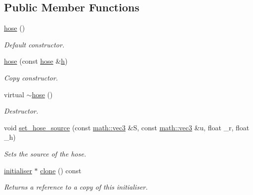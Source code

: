 \subsection*{Public Member Functions}
\begin{DoxyCompactItemize}
\item 
\mbox{\label{classphysim_1_1init_1_1hose_a1e74833ddbc964c7035a701c81f293f8}} 
\hyperlink{classphysim_1_1init_1_1hose_a1e74833ddbc964c7035a701c81f293f8}{hose} ()
\begin{DoxyCompactList}\small\item\em Default constructor. \end{DoxyCompactList}\item 
\hyperlink{classphysim_1_1init_1_1hose_ad29bc42187059e5d7e16f0e49819f138}{hose} (const \hyperlink{classphysim_1_1init_1_1hose}{hose} \&\hyperlink{classphysim_1_1init_1_1hose_a31d489427eb8f8db1b702cca637f8551}{h})
\begin{DoxyCompactList}\small\item\em Copy constructor. \end{DoxyCompactList}\item 
\mbox{\label{classphysim_1_1init_1_1hose_ad623ab25786c9aff8fe57839d81381bd}} 
virtual \hyperlink{classphysim_1_1init_1_1hose_ad623ab25786c9aff8fe57839d81381bd}{$\sim$hose} ()
\begin{DoxyCompactList}\small\item\em Destructor. \end{DoxyCompactList}\item 
void \hyperlink{classphysim_1_1init_1_1hose_a6f7f673fe4d7a21e850ad09ee27c2651}{set\+\_\+hose\+\_\+source} (const \hyperlink{structphysim_1_1math_1_1vec3}{math\+::vec3} \&S, const \hyperlink{structphysim_1_1math_1_1vec3}{math\+::vec3} \&u, float \+\_\+r, float \+\_\+h)
\begin{DoxyCompactList}\small\item\em Sets the source of the hose. \end{DoxyCompactList}\item 
\mbox{\label{classphysim_1_1init_1_1hose_ad758f23bec06ff89e79ba4e37b0abad6}} 
\hyperlink{classphysim_1_1init_1_1initialiser}{initialiser} $\ast$ \hyperlink{classphysim_1_1init_1_1hose_ad758f23bec06ff89e79ba4e37b0abad6}{clone} () const
\begin{DoxyCompactList}\small\item\em Returns a reference to a copy of this initialiser. \end{DoxyCompactList}\end{DoxyCompactItemize}
